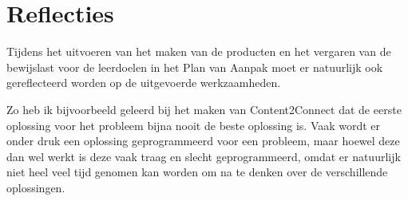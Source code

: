 \section{Reflecties}
Tijdens het uitvoeren van het maken van de producten en het vergaren van de bewijslast voor de leerdoelen in het Plan van Aanpak moet er natuurlijk ook gereflecteerd worden op de uitgevoerde werkzaamheden.

Zo heb ik bijvoorbeeld geleerd bij het maken van Content2Connect dat de eerste oplossing voor het probleem bijna nooit de beste oplossing is. Vaak wordt er onder druk een oplossing geprogrammeerd voor een probleem, maar hoewel deze dan wel werkt is deze vaak traag en slecht geprogrammeerd, omdat er natuurlijk niet heel veel tijd genomen kan worden om na te denken over de verschillende oplossingen.